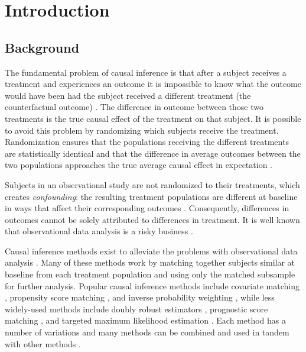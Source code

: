 \section{Introduction}

\subsection{Background}
 
The fundamental problem of causal inference is that after a subject receives a treatment and experiences an outcome it is impossible to know what the outcome would have been had the subject received a different treatment (the counterfactual outcome) \cite{Stuart:2013dt}. The difference in outcome between those two treatments is the true causal effect of the treatment on that subject. It is possible to avoid this problem by randomizing which subjects receive the treatment. Randomization ensures that the populations receiving the different treatments are statistically identical and that the difference in average outcomes between the two populations approaches the true average causal effect in expectation \cite{ROSENBAUM1983}.

Subjects in an observational study are not randomized to their treatments, which creates \textsl{confounding}: the resulting treatment populations are different at baseline in ways that affect their corresponding outcomes \cite{King2005}. Consequently, differences in outcomes cannot be solely attributed to differences in treatment. It is well known that observational data analysis is a risky business \cite{Rubin2010, Hannan:2008gh}. 

Causal inference methods exist to alleviate the problems with observational data analysis \cite{Stuart:2013dt}. Many of these methods work by matching together subjects similar at baseline from each treatment population and using only the matched subsample for further analysis. Popular causal inference methods include covariate matching \cite{Iacus}, propensity score matching \cite{ROSENBAUM1983}, and inverse probability weighting \cite{Robins1992}, while less widely-used methods include doubly robust estimators \cite{Robins1992}, prognostic score matching \cite{Leacy:2013fs}, and targeted maximum likelihood estimation \cite{Schuler:2017cq}. Each method has a number of variations and many methods can be combined and used in tandem with other methods \cite{Colson:2016fu}. 

